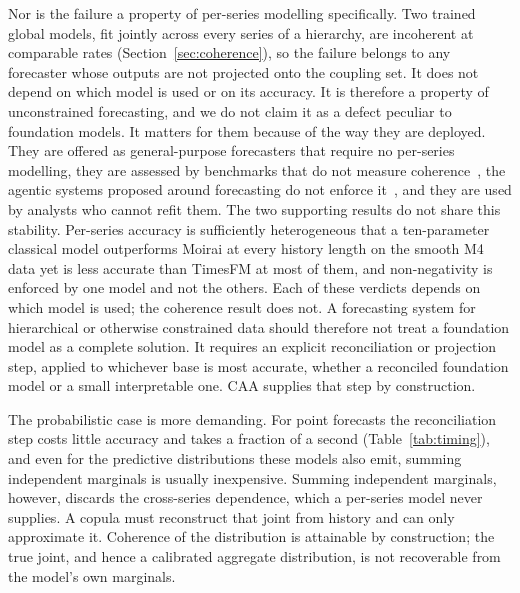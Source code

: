 \documentclass[review,number]{elsarticle}
\begin{document}
Nor is the failure a property of per-series modelling specifically. Two trained global
models, fit jointly across every series of a hierarchy, are incoherent at comparable
rates (Section~\ref{sec:coherence}), so the failure belongs to any forecaster whose
outputs are not projected onto the coupling set. It does
not depend on which model is used or on its accuracy. It is therefore a property of
unconstrained forecasting, and we do not claim it
as a defect peculiar to foundation models. It matters for them because of the way they
are deployed. They are offered as general-purpose forecasters that require no
per-series modelling, they are assessed by benchmarks that do not measure
coherence~\citep{gifteval2024,fevbench2025}, the agentic systems proposed around
forecasting do not enforce it~\citep{tsci2025,nexus2026,dcats2025}, and they are used by
analysts who
cannot refit them. The two supporting results do not share this stability. Per-series accuracy is sufficiently heterogeneous
that a ten-parameter classical model outperforms Moirai at every history length on the
smooth M4 data yet is less accurate than TimesFM at most of them, and
non-negativity is enforced by one model and not the others. Each of these verdicts
depends on which model is used; the coherence result does not. A
forecasting system for hierarchical or otherwise constrained data should therefore not
treat a foundation model as a complete solution. It requires an explicit
reconciliation or projection step, applied to whichever base is most accurate,
whether a reconciled foundation model or a small interpretable one. CAA supplies that
step by construction.

The probabilistic case is more demanding. For point forecasts the reconciliation step
costs little accuracy and takes a fraction of a second (Table~\ref{tab:timing}), and
even for the predictive distributions these models also emit, summing independent
marginals is usually inexpensive. Summing independent marginals, however, discards the
cross-series dependence, which a per-series model never supplies. A copula must
reconstruct that joint from
history and can only approximate it. Coherence of the distribution is attainable by
construction; the true joint, and hence a calibrated aggregate distribution, is not
recoverable from the model's own marginals.
\end{document}

